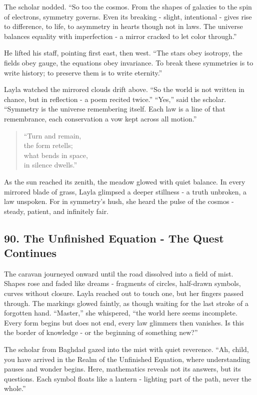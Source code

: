 \documentclass[
  letterpaper,
  DIV=11,
  numbers=noendperiod]{scrreprt}
\begin{document}
The scholar nodded. ``So too the cosmos. From the shapes of galaxies to
the spin of electrons, symmetry governs. Even its breaking - slight,
intentional - gives rise to difference, to life, to asymmetry in hearts
though not in laws. The universe balances equality with imperfection - a
mirror cracked to let color through.''

He lifted his staff, pointing first east, then west. ``The stars obey
isotropy, the fields obey gauge, the equations obey invariance. To break
these symmetries is to write history; to preserve them is to write
eternity.''

Layla watched the mirrored clouds drift above. ``So the world is not
written in chance, but in reflection - a poem recited twice.'' ``Yes,''
said the scholar. ``Symmetry is the universe remembering itself. Each
law is a line of that remembrance, each conservation a vow kept across
all motion.''

\begin{quote}
``Turn and remain,\\
the form retells;\\
what bends in space,\\
in silence dwells.''
\end{quote}

As the sun reached its zenith, the meadow glowed with quiet balance. In
every mirrored blade of grass, Layla glimpsed a deeper stillness - a
truth unbroken, a law unspoken. For in symmetry's hush, she heard the
pulse of the cosmos - steady, patient, and infinitely fair.

\subsection{90. The Unfinished Equation - The Quest
Continues}\label{the-unfinished-equation---the-quest-continues}

The caravan journeyed onward until the road dissolved into a field of
mist. Shapes rose and faded like dreams - fragments of circles,
half-drawn symbols, curves without closure. Layla reached out to touch
one, but her fingers passed through. The markings glowed faintly, as
though waiting for the last stroke of a forgotten hand. ``Master,'' she
whispered, ``the world here seems incomplete. Every form begins but does
not end, every law glimmers then vanishes. Is this the border of
knowledge - or the beginning of something new?''

The scholar from Baghdad gazed into the mist with quiet reverence. ``Ah,
child, you have arrived in the Realm of the Unfinished Equation, where
understanding pauses and wonder begins. Here, mathematics reveals not
its answers, but its questions. Each symbol floats like a lantern -
lighting part of the path, never the whole.''
\end{document}
